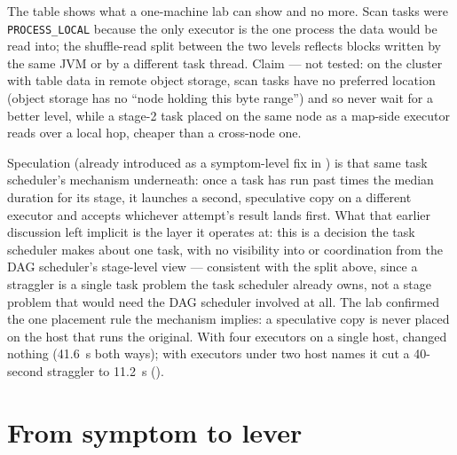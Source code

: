 The table shows what a one-machine lab can show and no more. Scan tasks were
\texttt{PROCESS\_LOCAL} because the only executor is the one process the data would
be read into; the shuffle-read split between the two levels reflects blocks written
by the same JVM or by a different task thread. Claim --- not tested: on the
cluster with table data in remote object storage, scan tasks have no preferred location (object storage
has no ``node holding this byte range'') and so never wait for a better level, while
a stage-2 task placed on the same node as a map-side executor reads over a local hop,
cheaper than a cross-node one.

Speculation (already introduced as a symptom-level fix in
) is that same task scheduler's mechanism
underneath: once a task has run past 
times the median duration for its stage, it launches a second, speculative
copy on a different executor and accepts whichever attempt's result lands
first. What that earlier discussion left implicit is the layer it operates
at: this is a decision the task scheduler makes about one task, with no
visibility into or coordination from the DAG scheduler's stage-level view
--- consistent with the split above, since a straggler is a single task
problem the task scheduler already owns, not a stage problem that would
need the DAG scheduler involved at all. The lab confirmed the one placement rule
the mechanism implies: a speculative copy is never placed on the host that runs the
original. With four executors on a single host,  changed
nothing (41.6~s both ways); with executors under two host names it cut a 40-second
straggler to 11.2~s ().

\section{From symptom to lever}
\label{sec:sched-levers}

